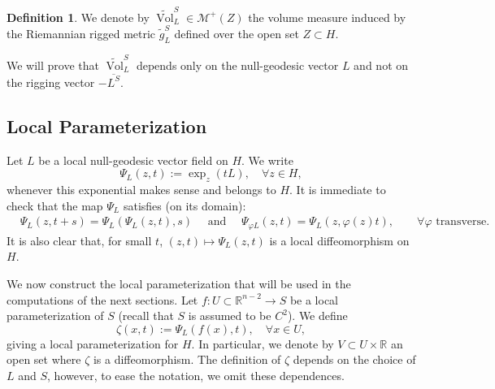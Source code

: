 \documentclass[12pt,a4paper]{amsart}
\theoremstyle{plain}
\theoremstyle{definition}
\newtheorem{definition}[lemma]{Definition}
\numberwithin{equation}{section}
\let\phi\varphi
\newcommand{\R}{\mathbb{R}}
\DeclareMathOperator{\vol}{Vol}
\newcommand{\gflow}{\Psi}
\newcommand{\lparam}{\zeta}
\begin{document}
\begin{definition}\label{def:tildeVol}
We denote by $\tilde{\vol}_L^S \in \mathcal{M}^{+}(Z)$ the volume measure induced by the Riemannian rigged
metric $\tilde{g}_L^S$ defined over the open set $Z \subset H$. 
\end{definition}

We will prove that $\tilde{\vol}_L^S$ depends only on the null-geodesic vector $L$ and not on the rigging vector $-\overline{L^S}$.




\subsection{Local Parameterization}
\label{SS:local-parameterization}
Let $L$ be a local null-geodesic vector field on $H$. We write 
\begin{equation}\label{eq;defPsiL}
\gflow_L(z,t):=\exp_z(tL), \quad \forall z\in H,
\end{equation}
whenever this exponential makes sense and
belongs to $H$.
%
It is immediate to check that the map $\gflow_L$ satisfies (on its domain):
\begin{align*}
  &
    \gflow_L(z,t+s)
    =
    \gflow_L(\gflow_L(z,t),s)
    \quad
    \text{ and }
    \quad
    \gflow_{\phi L}(z,t)
    =
    \gflow_L(z,\phi(z)t)
    ,
    \qquad
    \forall
    \phi
    \text{ transverse}
    .
\end{align*}
%
It is also clear that, for small $t$, $(z,t)\mapsto \gflow_L(z,t)$ is a
local diffeomorphism on $H$.




We now construct the local parameterization that will be used in the computations of the next sections.
%
Let $f:U\subset\R^{n-2}\to S$ be a local parameterization of $S$ (recall that $S$ is assumed to be $C^{2}$).
%
We define 
$$\lparam(x,t):=\gflow_L(f(x),t), \quad \forall x\in U,$$ 
giving a local
parameterization for $H$. In particular, we denote by $V \subset U\times \R$  an open set where 
$\lparam$ is a diffeomorphism.  
%
The definition of $\lparam$ depends on the choice of $L$ and  $S$, however,  to ease the notation, we  omit  these dependences.
\end{document}
